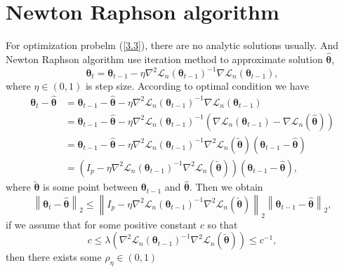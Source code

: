 \documentclass[12pt]{article}
\numberwithin{equation}{section}
\begin{document}
\section{Newton Raphson algorithm}
For optimization probelm (\ref{3.3}), there are no analytic solutions usually. And Newton Raphson algorithm use iteration method to approximate solution $\widehat{\boldsymbol{\theta}}$,
\begin{equation}
\boldsymbol{\theta}_t=\boldsymbol{\theta}_{t-1}-\eta \nabla^2\mathcal{L}_n(\boldsymbol{\theta}_{t-1})^{-1}\nabla\mathcal{L}_n(\boldsymbol{\theta}_{t-1}),
\end{equation}
where $\eta\in (0,1)$ is step size. According to optimal condition we have
\begin{align*}
\boldsymbol{\theta}_t-\widehat{\boldsymbol{\theta}}&=\boldsymbol{\theta}_{t-1}-\widehat{\boldsymbol{\theta}}-\eta\nabla^2\mathcal{L}_n(\boldsymbol{\theta}_{t-1})^{-1}\nabla\mathcal{L}_n(\boldsymbol{\theta}_{t-1})\\
&=\boldsymbol{\theta}_{t-1}-\widehat{\boldsymbol{\theta}}-\eta\nabla^2\mathcal{L}_n(\boldsymbol{\theta}_{t-1})^{-1}\left(\nabla\mathcal{L}_n(\boldsymbol{\theta}_{t-1})-\nabla\mathcal{L}_n(\widehat{\boldsymbol{\theta}})\right)\\
&=\boldsymbol{\theta}_{t-1}-\widehat{\boldsymbol{\theta}}-\eta\nabla^2\mathcal{L}_n(\boldsymbol{\theta}_{t-1})^{-1}\nabla^2\mathcal{L}_n(\widetilde{\boldsymbol{\theta}})\left(\boldsymbol{\theta}_{t-1}-\widehat{\boldsymbol{\theta}}\right)\\
&=\left(I_p-\eta\nabla^2\mathcal{L}_n(\boldsymbol{\theta}_{t-1})^{-1}\nabla^2\mathcal{L}_n(\widetilde{\boldsymbol{\theta}})\right)\left(\boldsymbol{\theta}_{t-1}-\widehat{\boldsymbol{\theta}}\right),
\end{align*}
where $\widetilde{\boldsymbol{\theta}}$ is some point between $\boldsymbol{\theta}_{t-1}$ and $\widehat{\boldsymbol{\theta}}$. Then we obtain
$$
\left\|\boldsymbol{\theta}_t-\widehat{\boldsymbol{\theta}}\right\|_2 \leq \left\|I_p-\eta\nabla^2\mathcal{L}_n(\boldsymbol{\theta}_{t-1})^{-1}\nabla^2\mathcal{L}_n(\widetilde{\boldsymbol{\theta}})\right\|_2\left\|\boldsymbol{\theta}_{t-1}-\widehat{\boldsymbol{\theta}}\right\|_2,
$$
if we assume that for some positive constant $c$ so that
\begin{equation}\label{4.2}
c\leq \lambda\left(\nabla^2\mathcal{L}_n(\boldsymbol{\theta}_{t-1})^{-1}\nabla^2\mathcal{L}_n(\widetilde{\boldsymbol{\theta}})\right) \leq c^{-1},
\end{equation}
then there exists some $\rho_{\eta}\in (0,1)$
\end{document}
